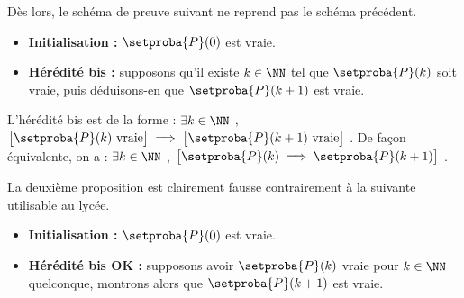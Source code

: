 \documentclass[12pt]{amsart}
\begin{document}
\bigskip

Dès lors, le schéma de preuve suivant ne reprend pas le schéma précédent.

	\begin{itemize}[label=\small\textbullet]
		\item \textbf{Initialisation :}
		      $\setproba{P}(0)$ est vraie.

		\item \textbf{Hérédité bis :}
		      supposons qu'il existe $k \in \NN$ tel que $\setproba{P}(k)$ soit vraie, puis déduisons-en que $\setproba{P}(k+1)$ est vraie.
	\end{itemize}

L'hérédité bis est de la forme :
$\exists k \in \NN$ , $\big[ \setproba{P}(k) \text{ vraie} \big] \implies \big[ \setproba{P}(k+1) \text{ vraie} \big]$ .
%
De façon équivalente, on a :
$\exists k \in \NN$ , $\big[ \setproba{P}(k) \implies \setproba{P}(k+1) \big]$ .

\medskip

La deuxième proposition est clairement fausse contrairement à la suivante utilisable au lycée.

	\begin{itemize}[label=\small\textbullet]
		\item \textbf{Initialisation :}
		      $\setproba{P}(0)$ est vraie.

		\item \textbf{Hérédité bis OK :}
		      supposons avoir $\setproba{P}(k)$ vraie pour $k \in \NN$ quelconque, montrons alors que $\setproba{P}(k+1)$ est vraie.
	\end{itemize}
\end{document}
